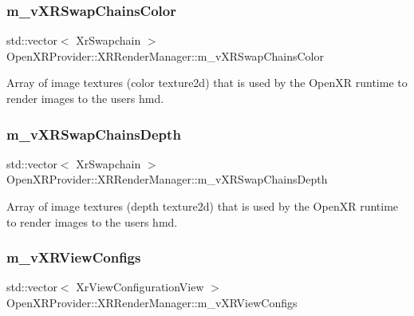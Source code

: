 \subsubsection{\texorpdfstring{m\_vXRSwapChainsColor}{m\_vXRSwapChainsColor}}
{\footnotesize\ttfamily std\+::vector$<$ Xr\+Swapchain $>$ Open\+X\+R\+Provider\+::\+X\+R\+Render\+Manager\+::m\+\_\+v\+X\+R\+Swap\+Chains\+Color\hspace{0.3cm}{\ttfamily [private]}}



Array of image textures (color texture2d) that is used by the Open\+XR runtime to render images to the user\textquotesingle{}s hmd. 

\mbox{\label{class_open_x_r_provider_1_1_x_r_render_manager_a438d088335da03c2c642a98af34b9f1f}} 
\subsubsection{\texorpdfstring{m\_vXRSwapChainsDepth}{m\_vXRSwapChainsDepth}}
{\footnotesize\ttfamily std\+::vector$<$ Xr\+Swapchain $>$ Open\+X\+R\+Provider\+::\+X\+R\+Render\+Manager\+::m\+\_\+v\+X\+R\+Swap\+Chains\+Depth\hspace{0.3cm}{\ttfamily [private]}}



Array of image textures (depth texture2d) that is used by the Open\+XR runtime to render images to the user\textquotesingle{}s hmd. 

\mbox{\label{class_open_x_r_provider_1_1_x_r_render_manager_a87a36cbfba8e5d2d733b47b1e0bb6558}} 
\subsubsection{\texorpdfstring{m\_vXRViewConfigs}{m\_vXRViewConfigs}}
{\footnotesize\ttfamily std\+::vector$<$ Xr\+View\+Configuration\+View $>$ Open\+X\+R\+Provider\+::\+X\+R\+Render\+Manager\+::m\+\_\+v\+X\+R\+View\+Configs\hspace{0.3cm}{\ttfamily [private]}}



